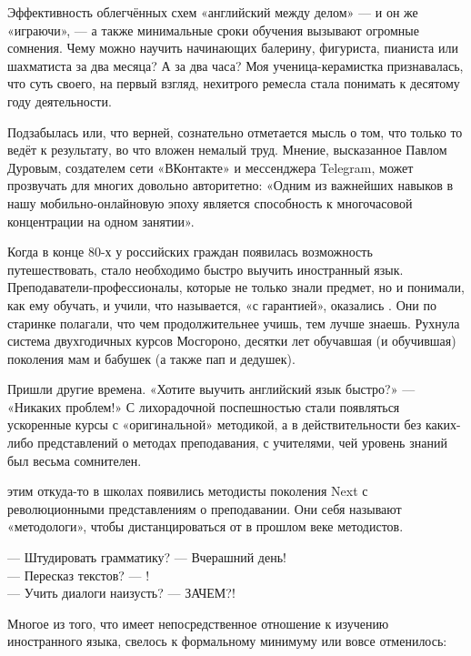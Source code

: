 Эффективность облегчённых схем «английский между делом» --- и он же «играючи», --- а также минимальные сроки обучения вызывают огромные сомнения. Чему можно научить начинающих балерину, фигуриста, пианиста или шахматиста за два месяца? А за два часа? Моя ученица-керамистка признавалась, что суть своего, на первый взгляд, нехитрого ремесла стала понимать к десятому году  деятельности.

Подзабылась или, что верней, сознательно отметается мысль о том, что только то ведёт к  результату, во что вложен немалый труд. Мнение, высказанное Павлом Дуровым, создателем сети «ВКонтакте» и мессенджера Telegram, может прозвучать для многих довольно авторитетно: «Одним из важнейших навыков в нашу мобильно-онлайновую эпоху является способность к многочасовой концентрации на одном занятии».

Когда в конце 80-х у российских граждан появилась возможность путешествовать, стало необходимо быстро выучить иностранный язык. Преподаватели-профессионалы, которые не только знали предмет, но и понимали, как ему обучать, и учили, что называется, «с гарантией», оказались . Они по старинке полагали, что чем продолжительнее учишь, тем лучше знаешь. Рухнула система двухгодичных курсов Мосгороно, десятки лет обучавшая (и обучившая) поколения мам и бабушек (а также пап и дедушек).

Пришли другие времена. «Хотите выучить английский язык быстро?» --- «Никаких проблем!» С лихорадочной поспешностью стали появляться ускоренные курсы с «оригинальной» методикой, а в действительности без каких-либо представлений о методах преподавания, с учителями, чей уровень знаний был весьма сомнителен.

 этим откуда-то в школах появились методисты поколения Next с революционными представлениям о преподавании. Они себя называют «методологи», чтобы дистанцироваться от   в прошлом веке методистов.

— Штудировать грамматику? --- Вчерашний день!\\
— Пересказ текстов? --- !\\
— Учить диалоги наизусть? --- ЗАЧЕМ?!

Многое из того, что имеет непосредственное отношение к изучению иностранного языка, свелось к формальному минимуму или вовсе отменилось:

